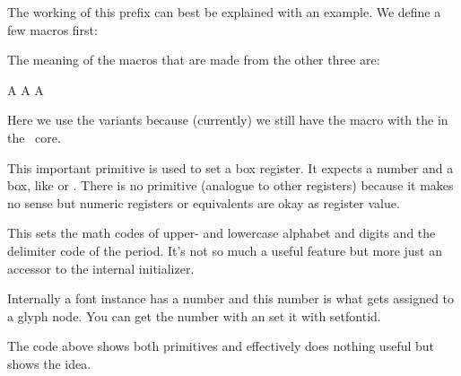 \startbuffer
              \def\TestA{A}
\semiprotected{}
    \protected{}

\edef\TestD{\TestA           \TestB           \TestC}
\edef\TestE{\TestA\semiexpand\TestB\semiexpand\TestC}
\edef\TestF{\TestA\expand    \TestB\expand    \TestC}

\edef\TestG{\normalexpanded    {\TestA\TestB\TestC}}
\edef\TestH{\normalsemiexpanded{\TestA\TestB\TestC}}
\stopbuffer

The working of this prefix can best be explained with an example. We define a few
macros first:

\typebuffer \getbuffer

The meaning of the macros that are made from the other three are:

\startbuffer
\meaningless\TestD
\meaningless\TestE
\meaningless\TestF
\meaningless\TestG
\meaningless\TestH
\stopbuffer

Here we use the  variants because (currently) we still have the
macro with the \type {\expanded} in the \CONTEXT\ core.

\startlines \tttf \getbuffer \stoplines

\stopnewprimitive

\startoldprimitive[title={\prm {setbox}}]

This important primitive is used to set a box register. It expects a number and a
box, like  or . There is no \type {\boxdef} primitive
(analogue to other registers) because it makes no sense but numeric registers or
equivalents are okay as register value.

\stopoldprimitive

\startnewprimitive[title={\prm {setdefaultmathcodes}}]

This sets the math codes of upper- and lowercase alphabet and digits and the
delimiter code of the period. It's not so much a useful feature but more just an
accessor to the internal initializer.

\stopnewprimitive

\startnewprimitive[title={\prm {setfontid}}]

Internally a font instance has a number and this number is what gets assigned to
a glyph node. You can get the number with  an set it with \prm
{setfontid}.

\starttyping
\setfontid\fontid\font
\stoptyping

The code above shows both primitives and effectively does nothing useful but
shows the idea.

